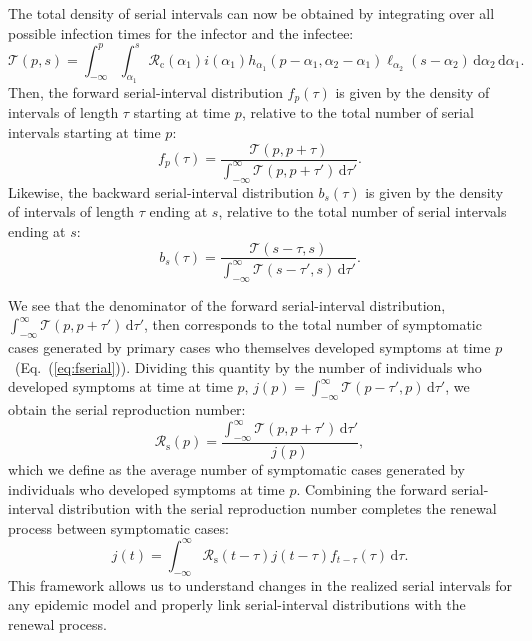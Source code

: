 \documentclass[12pt]{article}
\newcommand{\eref}[1]{Eq.~(\ref{eq:#1})}
\newcommand{\Rx}[1]{\ensuremath{{\mathcal R}_{#1}}\xspace}
\newcommand{\Rc}{\Rx{\mathrm{c}}}
\newcommand{\Rs}{\Rx{\mathrm{s}}}
\newcommand{\dd}[1]{\ensuremath{\, \mathrm{d}#1}}
\newcommand{\dtau}{\dd{\tau}}
\newcommand{\psymp}{\ensuremath{p}} %
\newcommand{\ssymp}{\ensuremath{s}} %
\newcommand{\pinf}{\ensuremath{\alpha_1}} %
\newcommand{\sinf}{\ensuremath{\alpha_2}} %
\newcommand{\idist}{\ell} %
\newcommand{\total}{{\mathcal T}} %
\begin{document}
The total density of serial intervals can now be obtained by integrating over all possible infection times for the infector and the infectee:
\begin{equation}
\total (\psymp,\ssymp) = \int_{-\infty}^{\psymp} \int_{\pinf}^{\ssymp} \Rc (\pinf) i(\pinf) h_{\pinf}(\psymp-\pinf, \sinf - \pinf) \idist_{\sinf}(\ssymp - \sinf) \, \mathrm{d}\sinf\,\mathrm{d}\pinf.
\end{equation}
Then, the forward serial-interval distribution $f_\psymp(\tau)$ is given by the density of intervals of length $\tau$ starting at time \psymp, relative to the total number of serial intervals starting at time \psymp: 
\begin{equation}
f_\psymp(\tau) = 
\frac{\total(\psymp, \psymp+\tau)}{\int_{-\infty}^\infty \total(\psymp, \psymp+\tau') \dtau'}.
\label{eq:fserial}
\end{equation}
Likewise, the backward serial-interval distribution $b_\ssymp(\tau)$ is given by the density of intervals of length $\tau$ ending at \ssymp, relative to the total number of serial intervals ending at \ssymp: 
\begin{equation}
b_\ssymp(\tau) = 
\frac{\total(\ssymp-\tau, \ssymp)}{\int_{-\infty}^\infty \total(\ssymp-\tau', \ssymp) \dtau'}.
\label{eq:bserial}
\end{equation}

We see that the denominator of the forward serial-interval distribution, $\int_{-\infty}^\infty \total(\psymp, \psymp+\tau') \dtau'$, then corresponds to the total number of symptomatic cases generated by primary cases who themselves developed symptoms at time \psymp\ (\eref{fserial}).
Dividing this quantity by the number of individuals who developed symptoms at time at time \psymp, $j(\psymp) = \int_{-\infty}^\infty \total(\psymp-\tau', \psymp) \dtau'$, we obtain the serial reproduction number:
\begin{equation}
\Rs(\psymp) = \frac{\int_{-\infty}^\infty \total(\psymp, \psymp+\tau') \dtau'}{j(\psymp)},
\end{equation}
which we define as the average number of symptomatic cases generated by individuals who developed symptoms at time \psymp.
Combining the forward serial-interval distribution with the serial reproduction number completes the renewal process between symptomatic cases:
\begin{equation}
j(t) = \int_{-\infty}^\infty \Rs(t-\tau) j(t-\tau) f_{t-\tau}(\tau) \dtau.
\label{eq:jrenew}
\end{equation}
This framework allows us to understand changes in the realized serial intervals for any epidemic model and properly link serial-interval distributions with the renewal process.
\end{document}
